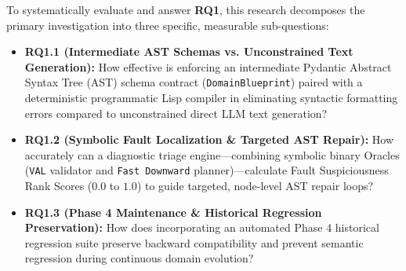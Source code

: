 \documentclass[11pt,a4paper]{report}
\begin{document}
To systematically evaluate and answer \textbf{RQ1}, this research decomposes the primary investigation into three specific, measurable sub-questions:
\begin{itemize}
    \item \textbf{RQ1.1 (Intermediate AST Schemas vs. Unconstrained Text Generation):} How effective is enforcing an intermediate Pydantic Abstract Syntax Tree (AST) schema contract (\texttt{DomainBlueprint}) paired with a deterministic programmatic Lisp compiler in eliminating syntactic formatting errors compared to unconstrained direct LLM text generation?
    \item \textbf{RQ1.2 (Symbolic Fault Localization \& Targeted AST Repair):} How accurately can a diagnostic triage engine—combining symbolic binary Oracles (\texttt{VAL} validator and \texttt{Fast Downward} planner)—calculate Fault Suspiciousness Rank Scores ($0.0$ to $1.0$) to guide targeted, node-level AST repair loops?
    \item \textbf{RQ1.3 (Phase 4 Maintenance \& Historical Regression Preservation):} How does incorporating an automated Phase 4 historical regression suite preserve backward compatibility and prevent semantic regression during continuous domain evolution?
\end{itemize}
\end{document}
